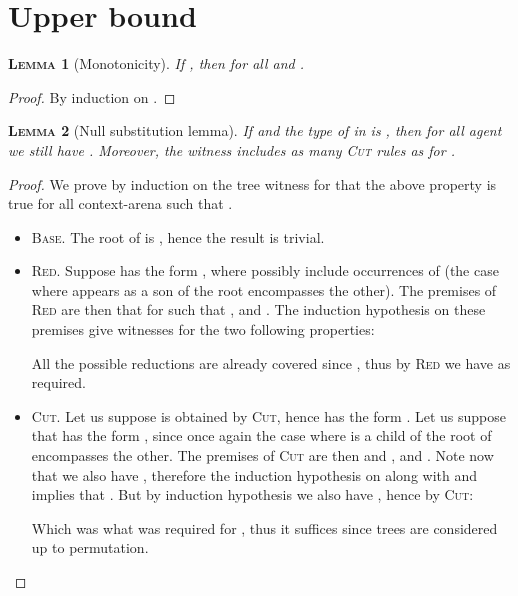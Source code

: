 \documentclass{article}
\newtheorem{lemma}{\textsc{Lemma}}
\begin{document}
\section{Upper bound}

\begin{lemma}[Monotonicity]
If , then  for all  and .
\label{monotonicity}
\end{lemma}
\begin{proof}
By induction on .
\end{proof}

\begin{lemma}[Null substitution lemma]
If  and the type of  in  is , then for all agent  we still have . Moreover, the witness includes as many \textsc{Cut} rules
as for .
\label{first_substitution}
\end{lemma}
\begin{proof}
We prove by induction on the tree witness for  that the above property is true for all context-arena  such that .
\begin{itemize}
\item \textsc{Base.} The root of  is , hence the result is trivial.
\item \textsc{Red.} Suppose  has the form , where  possibly include occurrences of  (the case where  appears as a son
of the root encompasses the other). The premises of \textsc{Red} are then that for  such that
, 
and . The induction hypothesis on these premises give witnesses for the two following properties:


All the possible reductions are already covered since , thus by \textsc{Red} we have  as required.
\item \textsc{Cut.} Let us suppose  is obtained by \textsc{Cut}, hence  has the form . Let us suppose
that  has the form , since once again the case where  is a child of the root of  encompasses the other. The premises of \textsc{Cut} are then
 and , and . Note now that we also have , therefore
the induction hypothesis on  along with  and  implies that
. But by induction hypothesis we also have , hence by \textsc{Cut}:

Which was what was required for , thus it suffices since trees are considered up to permutation.
\end{itemize}
\end{proof}
\end{document}
